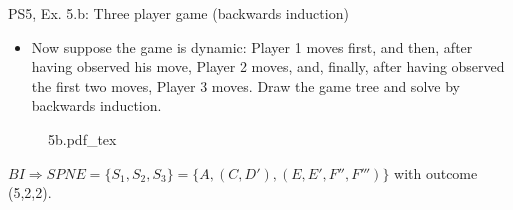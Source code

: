 \begin{frame}{PS5, Ex. 5.b: Three player game (backwards induction)}
    \begin{itemize}
      \item[(b)] Now suppose the game is dynamic: Player 1 moves first, and then, after having observed his move, Player 2 moves, and, finally, after having observed the first two moves, Player 3 moves. Draw the game tree and solve by backwards induction.
    \end{itemize}
    \vspace{-10pt}
    \begin{figure}[!h]
      \center
      \def\svgwidth{\columnwidth}
      {5b.pdf_tex}
    \end{figure}
    $BI \Rightarrow SPNE=\{S_1,S_2,S_3\}=\{A,(C,D'),(E,E',F'',F''')\}$ with outcome (5,2,2).
  \vfill\null
\end{frame}

